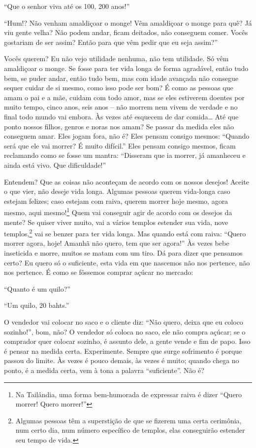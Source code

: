 “Que o senhor viva até os 100, 200 anos!” 

“Hum!? Não venham amaldiçoar o monge! Vêm amaldiçoar o monge para
quê? Já viu gente velha? Não podem andar, ficam deitados, não conseguem
comer. Vocês gostariam de ser assim? Então para que vêm pedir que eu
seja assim?”

Vocês querem? Eu não vejo utilidade nenhuma, não tem utilidade. Só
vêm amaldiçoar o monge. Se fosse para ter vida longa de forma
agradável, então tudo bem, se puder andar, então tudo bem, mas com
idade avançada não consegue sequer cuidar de si mesmo, como isso pode
ser bom? É como as pessoas que amam o pai e a mãe, cuidam com todo
amor, mas se eles estiverem doentes por muito tempo, cinco anos, seis
anos – não morrem nem vivem de verdade e no final todo mundo vai
embora. Às vezes até esquecem de dar comida… Até que ponto nossos
filhos, genros e noras nos amam? Se passar da medida eles não conseguem
amar. Eles jogam fora, não é? Eles pensam consigo mesmos: “Quando será
que ele vai morrer? É muito difícil.” Eles pensam consigo mesmos, ficam
reclamando como se fosse um mantra: “Disseram que ia morrer, já
amanheceu e ainda está vivo. Que dificuldade!”

Entendem? Que as coisas não aconteçam de acordo com os nossos
desejos! Aceite o que vier, não deseje vida longa. Algumas pessoas
querem vida-longa caso estejam felizes; caso estejam com raiva, querem
morrer hoje mesmo, agora mesmo, aqui mesmo!\footnote{Na Tailândia, uma
forma bem-humorada de expressar raiva é dizer “Quero morrer! Quero
morrer!”} Quem vai conseguir agir de acordo com os desejos da mente?
Se quiser viver muito, vai a vários templos estender sua vida, nove
templos,\footnote{Algumas pessoas têm a superstição de que se fizerem
uma certa cerimônia, num certo dia, num número específico de templos,
elas conseguirão estender seu tempo de vida.} vai se benzer para ter
vida longa. Mas quando está com raiva: “Quero morrer agora, hoje!
Amanhã não quero, tem que ser agora!” Às vezes bebe inseticida e morre,
muitos se matam com um tiro. Dá para dizer que pensamos certo? Eu quero
só o suficiente, esta vida em que nascemos não nos pertence, não nos
pertence. É como se fôssemos comprar açúcar no mercado:

“Quanto é um quilo?”

“Um quilo, 20 bahts.”

O vendedor vai colocar no saco e o cliente diz: “Não quero, deixa
que eu coloco sozinho!”, bom, não? O vendedor só coloca no saco, ele
não compra açúcar; se o comprador quer colocar sozinho, é assunto dele,
a gente vende e fim de papo. Isso é pensar na medida certa.
Experimente. Sempre que surge sofrimento é porque passou do limite. Às
vezes é pouco demais, às vezes é muito; quando chega no ponto, é a
medida certa, vem à tona a palavra “suficiente”. Não é?

